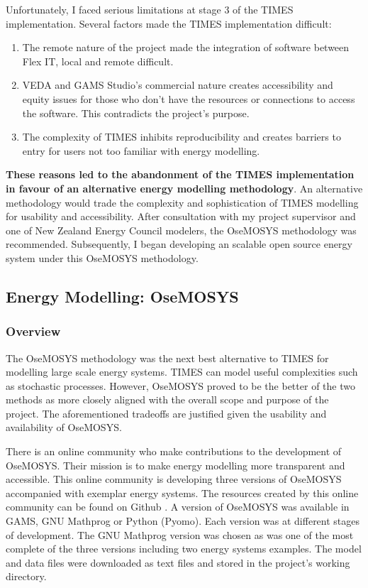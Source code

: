 \documentclass[12pt]{article}
\begin{document}
Unfortunately, I faced serious limitations at stage 3 of the TIMES implementation.
Several factors made the TIMES implementation difficult:
\begin{enumerate}
	\item The remote nature of the project made the integration of software between Flex IT, local and remote difficult.
	\item VEDA and GAMS Studio's commercial nature creates accessibility and equity issues for those who don't have the resources or connections to access the software. This contradicts the project's purpose.
	\item The complexity of TIMES inhibits reproducibility and creates barriers to entry for users not too familiar with energy modelling.
\end{enumerate}

\textbf{These reasons led to the abandonment of the TIMES implementation in favour of an alternative energy modelling methodology}. 
An alternative methodology would trade the complexity and sophistication of TIMES modelling for usability and accessibility. 
After consultation with my project supervisor and one of New Zealand Energy Council modelers, the OseMOSYS methodology was recommended.
Subsequently, I began developing an scalable open source energy system under this OseMOSYS methodology.

\subsection{Energy Modelling: OseMOSYS}
\subsubsection{Overview}\label{OseMOSYS}
The OseMOSYS methodology was the next best alternative to TIMES for modelling large scale energy systems.
TIMES can model useful complexities such as stochastic processes.
However, OseMOSYS proved to be the better of the two methods as more closely aligned with the overall scope and purpose of the project.
The aforementioned tradeoffs are justified given the usability and availability of OseMOSYS.

There is an online community who make contributions to the development of OseMOSYS.
Their mission is to make energy modelling more transparent and accessible.
This online community is developing three versions of OseMOSYS accompanied with exemplar energy systems.
The resources created by this online community can be found on Github \cite{GHOM}.
A version of OseMOSYS was available in GAMS, GNU Mathprog or Python (Pyomo).
Each version was at different stages of development. 
The GNU Mathprog version was chosen as was one of the most complete of the three versions including two energy systems examples.
The model and data files were downloaded as text files and stored in the project's working directory.
\end{document}
